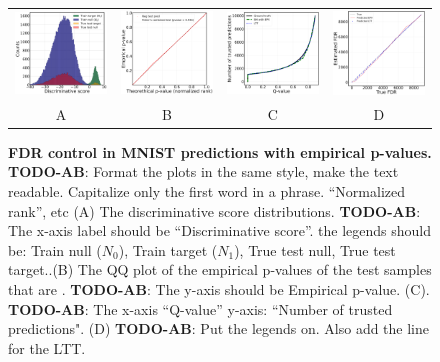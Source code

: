 \documentclass{article}
\newcommand{\todo}[2]{{\color{red} {\bf TODO-#1}: #2}}
\begin{document}
\begin{figure}
	\centering
	\begin{tabular}{cccc}
		\includegraphics[width=1.7in]{img/cls_overview.png}&
		\includegraphics[width=1.7in]{img/cnn_QQ_classical_lin.png} &
		\includegraphics[width=1.7in]{img/cnn_classical_fdr_control.png} &
		\includegraphics[width=1.7in]{img/cnn_FDRQQ_classical.png} \\
			
		A & B & C & D \\
%
	\end{tabular}
	\caption{{\bf FDR control in MNIST predictions with empirical p-values. }\todo{AB}{Format the plots in the same style, make the text readable.  Capitalize only the first word in a phrase. ``Normalized rank'', etc }
		(A) The discriminative score distributions. \todo{AB}{The x-axis label should be ``Discriminative score''. the legends should be: Train null ($N_0$), Train target ($N_1$), True test null, True test target.}.(B) The QQ plot of the empirical p-values of the test samples that are .  \todo{AB}{The y-axis should be Empirical p-value.} (C).  \todo{AB}{The x-axis ``Q-value'' y-axis: ``Number of trusted predictions".} (D) \todo{AB}{Put the legends on. Also add the line for the LTT.} }
	\label{fig:multi}
\end{figure}
\end{document}

